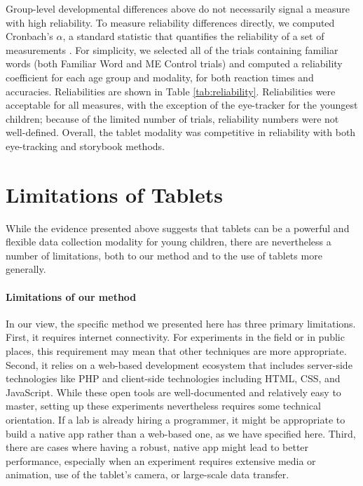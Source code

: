 \documentclass[man,noapacite]{apa2}
\begin{document}
Group-level developmental differences above do not necessarily signal a measure with high reliability. To measure reliability differences directly, we computed Cronbach's $\alpha$, a standard statistic that quantifies the reliability of a set of measurements \cite{santos1999}. For simplicity, we selected all of the trials containing familiar words (both Familiar Word and ME Control trials) and computed a reliability coefficient for each age group and modality, for both reaction times and accuracies. Reliabilities are shown in Table \ref{tab:reliability}. Reliabilities were acceptable for all measures, with the exception of the eye-tracker for the youngest children; because of the limited number of trials, reliability numbers were not well-defined. Overall, the tablet modality was competitive in reliability with both eye-tracking and storybook methods. 

\section{Limitations of Tablets}

While the evidence presented above suggests that tablets can be a powerful and flexible data collection modality for young children, there are nevertheless a number of limitations, both to our method and to the use of tablets more generally. 

\paragraph{Limitations of our method}

In our view, the specific method we presented here has three primary limitations. First, it requires internet connectivity. For experiments in the field or in public places, this requirement may mean that other techniques are more appropriate. Second, it relies on a web-based development ecosystem that includes server-side technologies like PHP and client-side technologies including HTML, CSS, and JavaScript. While these open tools are well-documented and relatively easy to master, setting up these experiments nevertheless requires some technical orientation. If a lab is already hiring a programmer, it might be appropriate to build a native app rather than a web-based one, as we have specified here. Third, there are cases where having a robust, native app might lead to better performance, especially when an experiment requires extensive media or animation, use of the tablet's camera, or large-scale data transfer.
\end{document}
